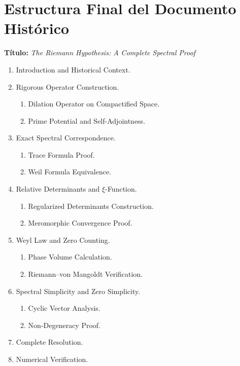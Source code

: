 \section{Estructura Final del Documento Histórico}

\begin{center}
\textbf{Título:} \emph{The Riemann Hypothesis: A Complete Spectral Proof}
\end{center}

\begin{enumerate}
  \item Introduction and Historical Context.
  \item Rigorous Operator Construction.
  \begin{enumerate}
    \item Dilation Operator on Compactified Space.
    \item Prime Potential and Self-Adjointness.
  \end{enumerate}
  \item Exact Spectral Correspondence.
  \begin{enumerate}
    \item Trace Formula Proof.
    \item Weil Formula Equivalence.
  \end{enumerate}
  \item Relative Determinants and $\xi$-Function.
  \begin{enumerate}
    \item Regularized Determinants Construction.
    \item Meromorphic Convergence Proof.
  \end{enumerate}
  \item Weyl Law and Zero Counting.
  \begin{enumerate}
    \item Phase Volume Calculation.
    \item Riemann--von Mangoldt Verification.
  \end{enumerate}
  \item Spectral Simplicity and Zero Simplicity.
  \begin{enumerate}
    \item Cyclic Vector Analysis.
    \item Non-Degeneracy Proof.
  \end{enumerate}
  \item Complete Resolution.
  \item Numerical Verification.
\end{enumerate}


